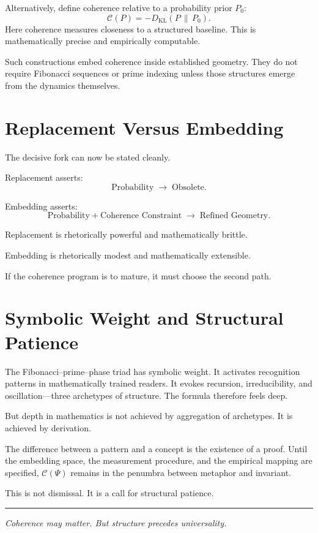 \documentclass[12pt]{article}
\begin{document}
Alternatively, define coherence relative to a probability prior $P_0$:
\[
  \mathcal{C}(P) = -D_{\mathrm{KL}}(P \,\|\, P_0).
\]
Here coherence measures closeness to a structured baseline. This is mathematically precise and empirically computable.

Such constructions embed coherence inside established geometry. They do not require Fibonacci sequences or prime indexing unless those structures emerge from the dynamics themselves.

\section{Replacement Versus Embedding}

The decisive fork can now be stated cleanly.

Replacement asserts:
\[
  \text{Probability} \;\to\; \text{Obsolete}.
\]

Embedding asserts:
\[
  \text{Probability} + \text{Coherence Constraint}
  \;\to\; \text{Refined Geometry}.
\]

Replacement is rhetorically powerful and mathematically brittle.

Embedding is rhetorically modest and mathematically extensible.

If the coherence program is to mature, it must choose the second path.

\section{Symbolic Weight and Structural Patience}

The Fibonacci–prime–phase triad has symbolic weight. It activates recognition patterns in mathematically trained readers. It evokes recursion, irreducibility, and oscillation—three archetypes of structure. The formula therefore feels deep.

But depth in mathematics is not achieved by aggregation of archetypes. It is achieved by derivation.

The difference between a pattern and a concept is the existence of a proof. Until the embedding space, the measurement procedure, and the empirical mapping are specified, $\mathcal{C}(\Psi)$ remains in the penumbra between metaphor and invariant.

This is not dismissal. It is a call for structural patience.

\bigskip
\hrule
\bigskip

\begin{center}
\small\itshape
Coherence may matter.  
But structure precedes universality.
\end{center}
\end{document}
